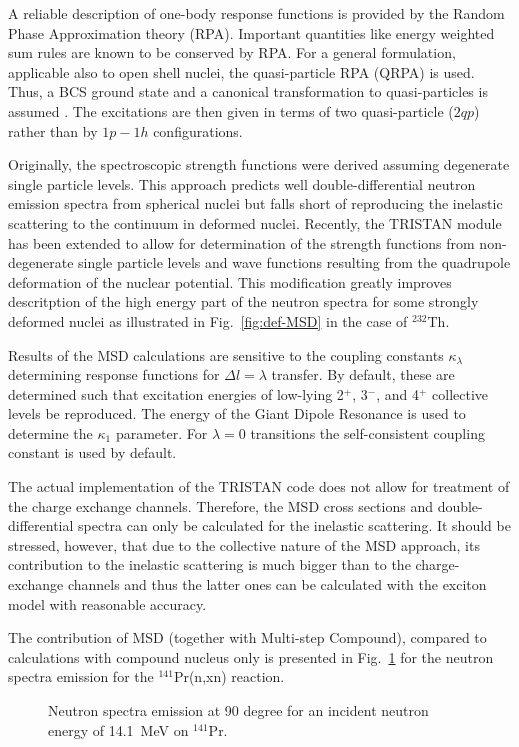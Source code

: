 \documentclass[twocolumn,amsmath,amssymb,10pt,groupedaddress,a4paper]{revtex4}
\begin{document}
A reliable
description of one-body response functions is provided by the Random
Phase Approximation theory \cite{Neg,Wal} (RPA).
Important quantities like energy weighted
sum rules are known to be conserved by RPA.
For a general formulation, applicable also to open shell nuclei, the
quasi-particle RPA (QRPA) is used. Thus, a BCS ground
state and a canonical transformation to quasi-particles is assumed
\cite{RS}. The excitations are then given in terms of two quasi-particle
($2qp$) rather than by $1p-1h$ configurations.

Originally, the spectroscopic strength functions were derived assuming degenerate
single particle levels. This approach predicts
well double-differential neutron emission spectra from spherical nuclei but
falls short of reproducing the inelastic scattering to the continuum in deformed nuclei.
Recently, the TRISTAN module has been extended to allow for determination of
the strength functions  from non-degenerate single particle levels
and wave functions resulting from the quadrupole deformation of the nuclear potential.
This modification greatly improves descritption of the high energy part of the neutron spectra for some strongly deformed nuclei as illustrated in Fig.~\ref{fig:def-MSD} in the case of $^{232}$Th.


Results of the MSD calculations are sensitive to the coupling
constants $\kappa_{\lambda}$ determining response functions for
$\Delta l=\lambda$ transfer. By default, these are determined such
that excitation energies of low-lying 2$^{+}$, 3$^{-}$, and 4$^{+}$ collective
levels be reproduced.  The energy of the Giant Dipole
Resonance is used to determine the $\kappa_{1}$ parameter. For $\lambda=0$
transitions the self-consistent coupling constant is used by default.

The actual implementation of the TRISTAN
code does not allow for treatment of the charge exchange channels.
Therefore, the MSD cross sections and double-differential
spectra can only be calculated for the inelastic scattering. It should
be stressed, however, that due to the collective nature of the MSD
approach, its contribution to the inelastic scattering is much bigger
than to the charge-exchange channels and thus the latter ones can
be calculated with the exciton model with
reasonable accuracy.

The contribution of MSD (together with Multi-step Compound), compared to
calculations with compound nucleus only is presented in Fig.~\ref{PrMSD} for
the neutron spectra emission for the $^{141}$Pr(n,xn) reaction.
\begin{figure}[htbp]
\caption{Neutron spectra emission at 90 degree for an incident neutron energy of 14.1~MeV on $^{141}$Pr.}
\label{PrMSD}
\end{figure}
\end{document}
